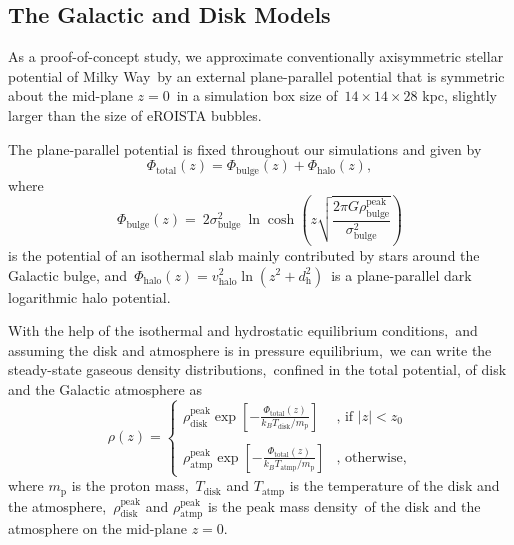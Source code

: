 \documentclass[twocolumn]{aastex631}
\begin{document}
  \subsection{The Galactic and Disk Models}
  As a proof-of-concept study, we approximate conventionally axisymmetric stellar potential of Milky Way\
  by an external plane-parallel potential that is symmetric about the mid-plane $z=0$\
  in a simulation box size of\
  $14\times14\times28$ kpc, slightly larger than the size of eROISTA bubbles.

  The plane-parallel potential is fixed throughout our simulations and given by
  \begin{equation}
    \Phi_{\text{total}}(z) = \Phi_{\text{bulge}}(z) + \Phi_{\text{halo}}(z),
  \end{equation}
  where
  \begin{equation}
    \Phi_{\text{bulge}}(z)=\
    2\sigma^2_{\text{bulge}}\
    \ln\cosh\left(z\sqrt{\frac{2\pi G\rho_{\text{bulge}}^{\text{peak}}}{\sigma^2_{\text{bulge}}}}\right)
  \end{equation}
  is the potential of an isothermal slab mainly contributed by stars around the Galactic bulge, and\
  $\Phi_{\text{halo}}(z)=v^2_{\text{halo}}\ln\left(z^2+d^2_{\text{h}}\right)$\
  is a plane-parallel dark logarithmic halo potential.

  With the help of the isothermal and hydrostatic equilibrium conditions,\
  and assuming the disk and atmosphere is in pressure equilibrium,\
  we can write the steady-state gaseous density distributions,\
  confined in the total potential, of disk and the Galactic atmosphere as\
  \begin{equation}
     \rho(z)=
     \begin{cases}
     \displaystyle\rho_{\text{disk}}^{\text{peak}}
     \exp\left[-\frac{\Phi_{\text{total}}(z)}{k_{B}T_{\text{disk}}/m_{\text{p}}}\right] & \text{, if $|z| < z_{0}$}\\
     \\
     \displaystyle\rho_{\text{atmp}}^{\text{peak}}
     \exp\left[-\frac{\Phi_{\text{total}}(z)}{k_{B}T_{\text{atmp}}/m_{\text{p}}}\right] & \text{, otherwise,}
     \end{cases}
  \end{equation}
  where $m_{\text{p}}$ is the proton mass,\
  $T_{\text{disk}}$ and $T_{\text{atmp}}$ is the temperature of the disk and the atmosphere,\
  $\rho_{\text{disk}}^{\text{peak}}$ and $\rho_{\text{atmp}}^{\text{peak}}$ is the peak mass density\
  of the disk and the atmosphere on the mid-plane $z=0$.
\end{document}
